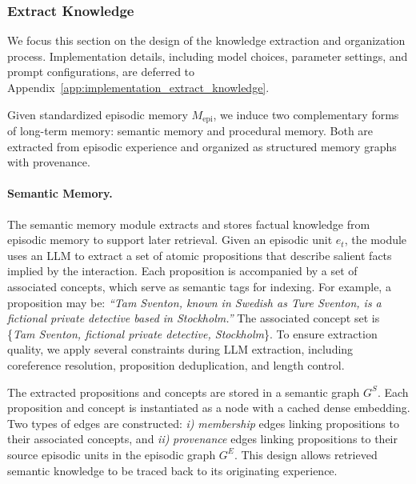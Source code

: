 \subsubsection{Extract Knowledge}
\label{subsubsec:extract}

We focus this section on the design of the knowledge extraction and organization process.
Implementation details, including model choices, parameter settings, and prompt configurations, are deferred to Appendix~\ref{app:implementation_extract_knowledge}.

Given standardized episodic memory $M_{\text{epi}}$, we induce two complementary forms of long-term memory: semantic memory and procedural memory. 
Both are extracted from episodic experience and organized as structured memory graphs with provenance.

\paragraph{Semantic Memory.}
The semantic memory module extracts and stores factual knowledge from episodic memory to support later retrieval.
Given an episodic unit $e_t$, the module uses an LLM to extract a set of atomic propositions that describe salient facts implied by the interaction.
Each proposition is accompanied by a set of associated concepts, which serve as semantic tags for indexing.
For example, a proposition may be:
\emph{``Tam Sventon, known in Swedish as Ture Sventon, is a fictional private detective based in Stockholm.''}
The associated concept set is \{\emph{Tam Sventon, fictional private detective, Stockholm}\}.
To ensure extraction quality, we apply several constraints during LLM extraction, including coreference resolution, proposition deduplication, and length control.

The extracted propositions and concepts are stored in a semantic graph $G^{S}$.
Each proposition and concept is instantiated as a node with a cached dense embedding.
Two types of edges are constructed:
\textit{i)} \emph{membership} edges linking propositions to their associated concepts, and
\textit{ii)} \emph{provenance} edges linking propositions to their source episodic units in the episodic graph $G^{E}$.
This design allows retrieved semantic knowledge to be traced back to its originating experience.



